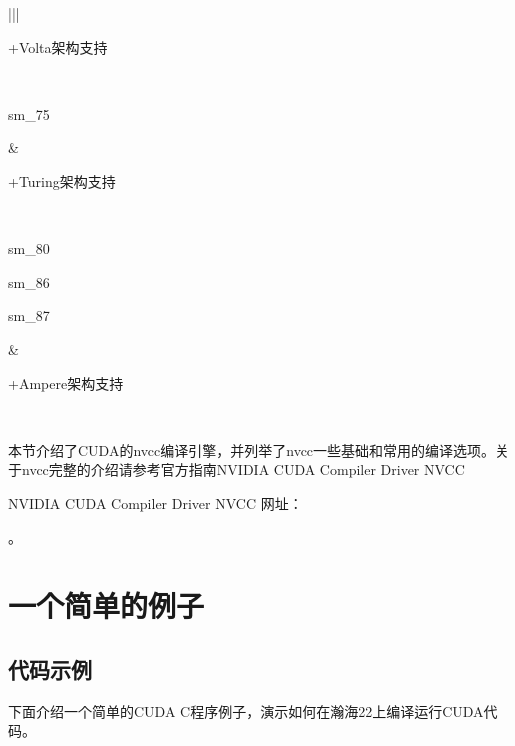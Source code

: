 \documentclass[a4paper,12pt,english]{sphinxmanual}
\begin{document}
\begin{savenotes}
\begin{tabular}[t]{|*{2}{|}}
\begin{DUlineblock}{0em}
\item[] +Volta架构支持
\item[] 
\end{DUlineblock}
\\
\sphinxhline
\begin{DUlineblock}{0em}
\item[] sm\_75
\end{DUlineblock}
&
\begin{DUlineblock}{0em}
\item[] +Turing架构支持
\end{DUlineblock}
\\
\sphinxhline
\begin{DUlineblock}{0em}
\item[] sm\_80
\item[] sm\_86
\item[] sm\_87
\end{DUlineblock}
&
\begin{DUlineblock}{0em}
\item[] 
\item[] +Ampere架构支持
\item[] 
\end{DUlineblock}
\\
\sphinxbottomrule
\end{tabular}
\sphinxtableafterendhook\par
\sphinxattableend\end{savenotes}

\sphinxAtStartPar
本节介绍了CUDA的nvcc编译引擎，并列举了nvcc一些基础和常用的编译选项。关于nvcc完整的介绍请参考官方指南NVIDIA CUDA Compiler Driver NVCC %
\begin{footnote}[3]\sphinxAtStartFootnote
NVIDIA CUDA Compiler Driver NVCC
网址：
%
\end{footnote}。


\section{一个简单的例子}
\label{\detokenize{gpu-computing/gpu-computing:id8}}

\subsection{代码示例}
\label{\detokenize{gpu-computing/gpu-computing:id9}}
\sphinxAtStartPar
下面介绍一个简单的CUDA C程序例子，演示如何在瀚海22上编译运行CUDA代码。
\end{document}
